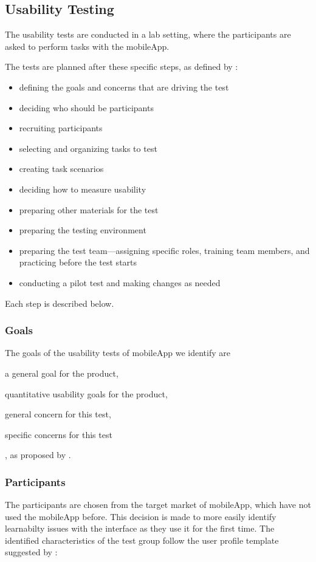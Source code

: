 \subsection{Usability Testing}
The usability tests are conducted in a lab setting, where the participants are asked to perform tasks with the mobileApp.

The tests are planned after these specific steps, as defined by \cite{Dumas1999}:

\begin{itemize}[noitemsep]
  \item defining the goals and concerns that are driving the test
  \item deciding who should be participants
  \item recruiting participants
  \item selecting and organizing tasks to test
  \item creating task scenarios
  \item deciding how to measure usability
  \item preparing other materials for the test
  \item preparing the testing environment
  \item preparing the test team---assigning specific roles, training team members, and practicing before the test starts
  \item conducting a pilot test and making changes as needed
\end{itemize}

Each step is described below.

\subsubsection{Goals}
\label{subsubsec:goals}
The goals of the usability tests of mobileApp we identify are \begin{enumerate*}[label=(\(\arabic*\))]
  \item a general goal for the product,
  \item quantitative usability goals for the product,
  \item general concern for this test,
  \item specific concerns for this test
\end{enumerate*}, as proposed by \cite{Dumas1999}.

\subsubsection{Participants}
\label{subsubsec:participants}
The participants are chosen from the target market of mobileApp, which have not used the mobileApp before. This decision is made to more easily identify learnabilty issues with the interface as they use it for the first time. The identified characteristics of the test group follow the user profile template suggested by \cite{Dumas1999}:


